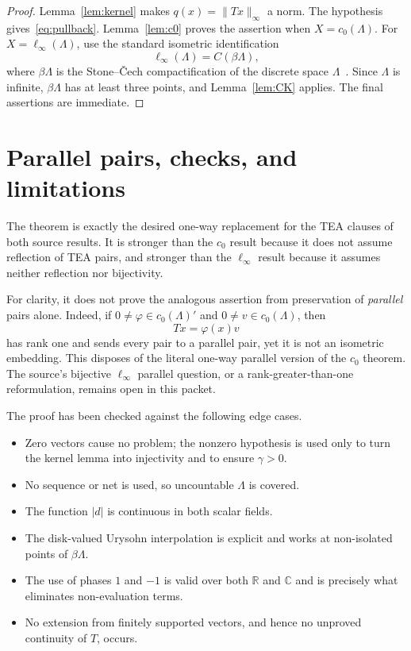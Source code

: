 \documentclass[11pt]{article}
\begin{document}
\begin{proof}
Lemma~\ref{lem:kernel} makes $q(x)=\|Tx\|_\infty$ a norm.  The hypothesis
gives~\eqref{eq:pullback}.  Lemma~\ref{lem:c0} proves the assertion when
$X=c_0(\Lambda)$.  For $X=\ell_\infty(\Lambda)$, use the standard isometric
identification
\[
 \ell_\infty(\Lambda)=C(\beta\Lambda),
\]
where $\beta\Lambda$ is the Stone--\v Cech compactification of the discrete
space $\Lambda$~\cite{GJ}.  Since $\Lambda$ is infinite,
$\beta\Lambda$ has at least three points, and Lemma~\ref{lem:CK} applies.
The final assertions are immediate.
\end{proof}

\section{Parallel pairs, checks, and limitations}

The theorem is exactly the desired one-way replacement for the TEA clauses
of both source results.  It is stronger than the $c_0$ result because it does
not assume reflection of TEA pairs, and stronger than the $\ell_\infty$
result because it assumes neither reflection nor bijectivity.

For clarity, it does not prove the analogous assertion from preservation of
\emph{parallel} pairs alone.  Indeed, if $0\ne\varphi\in c_0(\Lambda)'$ and
$0\ne v\in c_0(\Lambda)$, then
\[
 Tx=\varphi(x)v
\]
has rank one and sends every pair to a parallel pair, yet it is not an
isometric embedding.  This disposes of the literal one-way parallel version
of the $c_0$ theorem.  The source's bijective $\ell_\infty$ parallel question,
or a rank-greater-than-one reformulation, remains open in this packet.

The proof has been checked against the following edge cases.
\begin{itemize}
\item Zero vectors cause no problem; the nonzero hypothesis is used only to
      turn the kernel lemma into injectivity and to ensure $\gamma>0$.
\item No sequence or net is used, so uncountable $\Lambda$ is covered.
\item The function $|d|$ is continuous in both scalar fields.
\item The disk-valued Urysohn interpolation is explicit and works at
      non-isolated points of $\beta\Lambda$.
\item The use of phases $1$ and $-1$ is valid over both $\mathbb R$ and
      $\mathbb C$ and is precisely what eliminates non-evaluation terms.
\item No extension from finitely supported vectors, and hence no unproved
      continuity of $T$, occurs.
\end{itemize}
\end{document}
